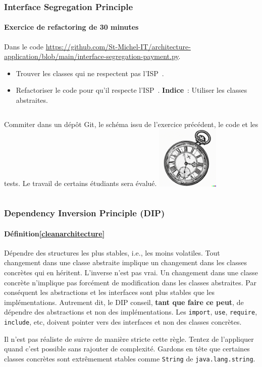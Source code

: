 \documentclass{beamer}
\begin{document}
    \begin{frame}
        \transdissolve
        \frametitle{Interface Segregation Principle}
        \framesubtitle{Exercice \execcounterdispinc{} de refactoring de 30 minutes}
        Dans le code \url{https://github.com/St-Michel-IT/architecture-application/blob/main/interface-segregation-payment.py}.
        \begin{itemize}
            \item Trouver les classes qui ne respectent pas l'ISP~.
            \item Refactoriser le code pour qu'il respecte l'ISP~. \textbf{Indice}~: Utiliser les classes abstraites.
        \end{itemize}
        \bigbreak
        \begin{columns}
            Commiter dans un dépôt Git, le schéma issu de l'exercice précédent, le code et les tests.
            \bigbreak
            Le travail de certains étudiants sera évalué.
            \centering
            \includegraphics[width=3cm]{image/engraving-of-an-old-watch}
        \end{columns}
    \end{frame}

    \begin{frame}
        \transdissolve
        \frametitle{Dependency Inversion Principle (DIP)}
        \framesubtitle{Définition\cref{cleanarchitecture}}
        Dépendre des structures les plus stables, i.e., les moins volatiles.
        \bigbreak
        Tout changement dans une classe abstraite implique un changement dans les classes concrètes qui en héritent.
        L'inverse n'est pas vrai.
        Un changement dans une classe concrète n'implique pas forcément de modification dans les classes abstraites.
        \bigbreak
        Par conséquent les abstractions et les interfaces sont plus stables que les implémentations.
        \bigbreak
        Autrement dit, le DIP conseil, \textbf{tant que faire ce peut}, de dépendre des abstractions et non des implémentations.
        Les \lstinline{import}, \lstinline{use}, \lstinline{require}, \lstinline{include}, etc, doivent pointer vers des interfaces et non des classes concrètes.
        \begin{footnotesize}
            \begin{dangercolorbox}
                Il n'est pas réaliste de suivre de manière stricte cette règle.
                Tentez de l'appliquer quand c'est possible sans rajouter de complexité.
                Gardons en tête que certaines classes concrètes sont extrêmement stables comme \lstinline{String} de \lstinline{java.lang.string}.
            \end{dangercolorbox}
        \end{footnotesize}
    \end{frame}
\end{document}
